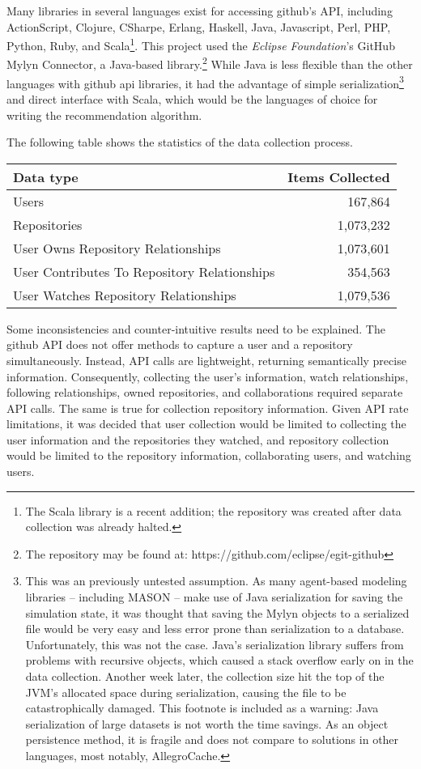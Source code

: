 \documentclass{article}
\begin{document}
  Many libraries in several languages exist for accessing github's API, including ActionScript, Clojure, CSharpe, Erlang, Haskell, Java, Javascript, Perl, PHP, Python, Ruby, and Scala\footnote{The Scala library is a recent addition; the repository was created after data collection was already halted.}.\cite{githublibraries} This project used the \emph{Eclipse Foundation}'s GitHub Mylyn Connector, a Java-based library.\footnote{The repository may be found at: https://github.com/eclipse/egit-github} While Java is less flexible than the other languages with github api libraries, it had the advantage of simple serialization\footnote{This was an previously untested assumption. As many agent-based modeling libraries -- including MASON -- make use of Java serialization for saving the simulation state, it was thought that saving the Mylyn objects to a serialized file would be very easy and less error prone than serialization to a database. Unfortunately, this was not the case. Java's serialization library suffers from problems with recursive objects, which caused a stack overflow early on in the data collection. Another week later, the collection size hit the top of the JVM's allocated space during serialization, causing the file to be catastrophically damaged. This footnote is included as a warning: Java serialization of large datasets is not worth the time savings. As an object persistence method, it is fragile and does not compare to solutions in other languages, most notably, AllegroCache.} and direct interface with Scala, which would be the languages of choice for writing the recommendation algorithm.

  The following table shows the statistics of the data collection process. 

  \begin{center}
    \begin{tabular}{ | l | r |}
    \hline
    Data type & Items Collected \\ \hline
    Users & 167,864 \\
    Repositories & 1,073,232 \\
    User Owns Repository Relationships & 1,073,601 \\
    User Contributes To Repository Relationships & 354,563 \\
    User Watches Repository Relationships & 1,079,536 \\
    \hline
    \end{tabular}
  \end{center}

  Some inconsistencies and counter-intuitive results need to be explained. The github API does not offer methods to capture a user and a repository simultaneously. Instead, API calls are lightweight, returning semantically precise information. Consequently, collecting the user's information, watch relationships, following relationships, owned repositories, and collaborations required separate API calls. The same is true for collection repository information. Given API rate limitations, it was decided that user collection would be limited to collecting the user information and the repositories they watched, and repository collection would be limited to the repository information, collaborating users, and watching users.
\end{document}
